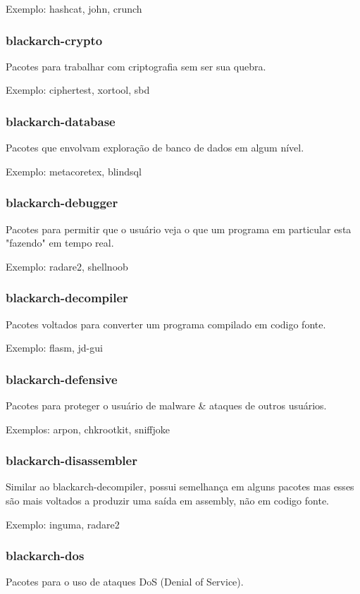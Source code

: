 \documentclass[a4paper, oneside, 11pt]{book}
\begin{document}
Exemplo: hashcat, john, crunch

\subsubsection{blackarch-crypto}
Pacotes para trabalhar com criptografia sem ser sua quebra.

Exemplo: ciphertest, xortool, sbd

\subsubsection{blackarch-database}
Pacotes que envolvam exploração de banco de dados em algum nível.

Exemplo: metacoretex, blindsql

\subsubsection{blackarch-debugger}
Pacotes para permitir que o usuário veja o que um programa em particular esta "fazendo" em tempo real.

Exemplo: radare2, shellnoob

\subsubsection{blackarch-decompiler}
Pacotes voltados para converter um programa compilado em codigo fonte.

Exemplo: flasm, jd-gui

\subsubsection{blackarch-defensive}
Pacotes para proteger o usuário de malware \& ataques de outros usuários.

Exemplos: arpon, chkrootkit, sniffjoke

\subsubsection{blackarch-disassembler}
Similar ao blackarch-decompiler, possui semelhança em alguns pacotes mas esses são mais voltados a produzir uma saída em assembly, não em codigo fonte.

Exemplo: inguma, radare2

\subsubsection{blackarch-dos}
Pacotes para o uso de ataques DoS (Denial of Service).
\end{document}
